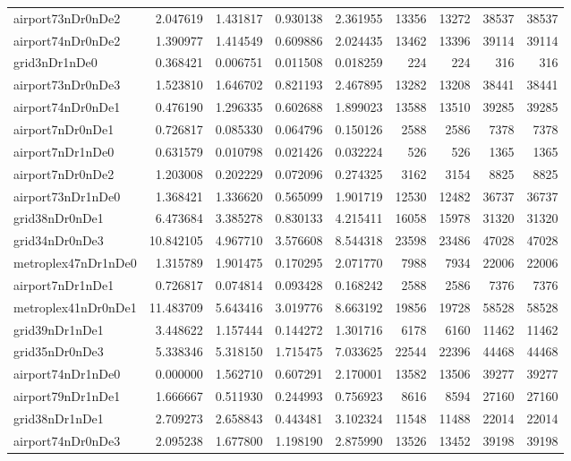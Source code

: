 \begin{longtable}{|l|r|r|r|r|r|r|r|r|}
airport73nDr0nDe2 & 2.047619 & 1.431817 & 0.930138 & 2.361955 & 13356 & 13272 & 38537 & 38537 \\
airport74nDr0nDe2 & 1.390977 & 1.414549 & 0.609886 & 2.024435 & 13462 & 13396 & 39114 & 39114 \\
grid3nDr1nDe0 & 0.368421 & 0.006751 & 0.011508 & 0.018259 & 224 & 224 & 316 & 316 \\
airport73nDr0nDe3 & 1.523810 & 1.646702 & 0.821193 & 2.467895 & 13282 & 13208 & 38441 & 38441 \\
airport74nDr0nDe1 & 0.476190 & 1.296335 & 0.602688 & 1.899023 & 13588 & 13510 & 39285 & 39285 \\
airport7nDr0nDe1 & 0.726817 & 0.085330 & 0.064796 & 0.150126 & 2588 & 2586 & 7378 & 7378 \\
airport7nDr1nDe0 & 0.631579 & 0.010798 & 0.021426 & 0.032224 & 526 & 526 & 1365 & 1365 \\
airport7nDr0nDe2 & 1.203008 & 0.202229 & 0.072096 & 0.274325 & 3162 & 3154 & 8825 & 8825 \\
airport73nDr1nDe0 & 1.368421 & 1.336620 & 0.565099 & 1.901719 & 12530 & 12482 & 36737 & 36737 \\
grid38nDr0nDe1 & 6.473684 & 3.385278 & 0.830133 & 4.215411 & 16058 & 15978 & 31320 & 31320 \\
grid34nDr0nDe3 & 10.842105 & 4.967710 & 3.576608 & 8.544318 & 23598 & 23486 & 47028 & 47028 \\
metroplex47nDr1nDe0 & 1.315789 & 1.901475 & 0.170295 & 2.071770 & 7988 & 7934 & 22006 & 22006 \\
airport7nDr1nDe1 & 0.726817 & 0.074814 & 0.093428 & 0.168242 & 2588 & 2586 & 7376 & 7376 \\
metroplex41nDr0nDe1 & 11.483709 & 5.643416 & 3.019776 & 8.663192 & 19856 & 19728 & 58528 & 58528 \\
grid39nDr1nDe1 & 3.448622 & 1.157444 & 0.144272 & 1.301716 & 6178 & 6160 & 11462 & 11462 \\
grid35nDr0nDe3 & 5.338346 & 5.318150 & 1.715475 & 7.033625 & 22544 & 22396 & 44468 & 44468 \\
airport74nDr1nDe0 & 0.000000 & 1.562710 & 0.607291 & 2.170001 & 13582 & 13506 & 39277 & 39277 \\
airport79nDr1nDe1 & 1.666667 & 0.511930 & 0.244993 & 0.756923 & 8616 & 8594 & 27160 & 27160 \\
grid38nDr1nDe1 & 2.709273 & 2.658843 & 0.443481 & 3.102324 & 11548 & 11488 & 22014 & 22014 \\
airport74nDr0nDe3 & 2.095238 & 1.677800 & 1.198190 & 2.875990 & 13526 & 13452 & 39198 & 39198 \\

\end{longtable}

